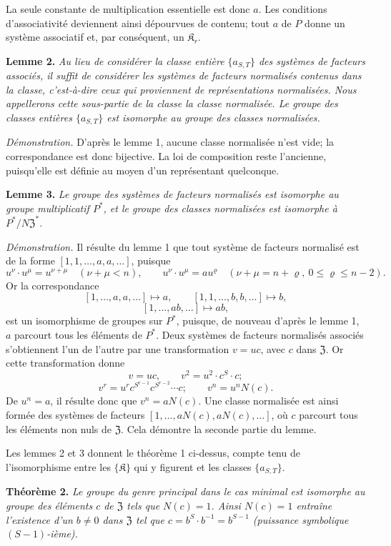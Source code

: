 La seule constante de multiplication essentielle est donc \(a\). Les conditions d'associativité deviennent ainsi dépourvues de contenu; tout \(a\) de \(P\) donne un système associatif et, par conséquent, un \(\mathfrak K_r\).

\noindent\textbf{Lemme 2.} \emph{Au lieu de considérer la classe entière \(\{a_{S,T}\}\) des systèmes de facteurs associés, il suffit de considérer les systèmes de facteurs normalisés contenus dans la classe, c'est-à-dire ceux qui proviennent de représentations normalisées. Nous appellerons cette sous-partie de la classe la classe normalisée. Le groupe des classes entières \(\{a_{S,T}\}\) est isomorphe au groupe des classes normalisées.}

\noindent\emph{Démonstration.} D'après le lemme 1, aucune classe normalisée n'est vide; la correspondance est donc bijective. La loi de composition reste l'ancienne, puisqu'elle est définie au moyen d'un représentant quelconque.

\noindent\textbf{Lemme 3.} \emph{Le groupe des systèmes de facteurs normalisés est isomorphe au groupe multiplicatif \(P^*\), et le groupe des classes normalisées est isomorphe à \(P^*/N\mathfrak Z^*\).}

\noindent\emph{Démonstration.} Il résulte du lemme 1 que tout système de facteurs normalisé est de la forme \([1,1,\ldots,a,a,\ldots]\), puisque
\[
u^\nu\cdot u^\mu=u^{\nu+\mu}\quad(\nu+\mu<n),
\qquad
u^\nu\cdot u^\mu=au^\varrho\quad(\nu+\mu=n+\varrho,\ 0\leq\varrho\leq n-2).
\]
Or la correspondance
\[
[1,\ldots,a,a,\ldots]\mapsto a,
\qquad
[1,1,\ldots,b,b,\ldots]\mapsto b,
\]
\[
[1,\ldots,ab,\ldots]\mapsto ab,
\]
est un isomorphisme de groupes sur \(P^*\), puisque, de nouveau d'après le lemme 1, \(a\) parcourt tous les éléments de \(P^*\). Deux systèmes de facteurs normalisés associés s'obtiennent l'un de l'autre par une transformation \(v=uc\), avec \(c\) dans \(\mathfrak Z\). Or cette transformation donne
\[
v=uc,\qquad v^2=u^2\cdot c^S\cdot c;
\]
\[
v^r=u^r c^{S^{r-1}}c^{S^{r-2}}\cdots c;
\qquad
v^n=u^nN(c).
\]
De \(u^n=a\), il résulte donc que \(v^n=aN(c)\). Une classe normalisée est ainsi formée des systèmes de facteurs \([1,\ldots,aN(c),aN(c),\ldots]\), où \(c\) parcourt tous les éléments non nuls de \(\mathfrak Z\). Cela démontre la seconde partie du lemme.

Les lemmes 2 et 3 donnent le théorème 1 ci-dessus, compte tenu de l'isomorphisme entre les \(\{\mathfrak K\}\) qui y figurent et les classes \(\{a_{S,T}\}\).

\noindent\textbf{Théorème 2.} \emph{Le groupe du genre principal dans le cas minimal est isomorphe au groupe des éléments \(c\) de \(\mathfrak Z\) tels que \(N(c)=1\). Ainsi \(N(c)=1\) entraîne l'existence d'un \(b\neq0\) dans \(\mathfrak Z\) tel que \(c=b^S\cdot b^{-1}=b^{S-1}\) (puissance symbolique \((S-1)\)-ième).}

